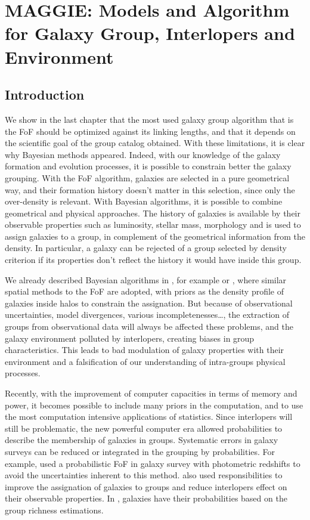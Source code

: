 \chapter[MAGGIE]{MAGGIE\@: Models and Algorithm for Galaxy Group,
Interlopers and Environment}

\section{Introduction}
\label{sec:maggie_introduction}

We show in the last chapter that the most used galaxy group algorithm that
is the FoF should be optimized against its linking lengths, and that it
depends on the scientific goal of the group catalog obtained. With these
limitations, it is clear why Bayesian methods appeared. Indeed, with our
knowledge of the galaxy formation and evolution processes, it is possible to
constrain better the galaxy grouping. With the FoF algorithm, galaxies are
selected in a pure geometrical way, and their formation history doesn't
matter in this selection, since only the over-density is relevant. With
Bayesian algorithms, it is possible to combine geometrical and physical
approaches. The history of galaxies is available by their observable
properties such as luminosity, stellar mass, morphology and is used to
assign galaxies to a group, in complement of the geometrical information
from the density. In particular, a galaxy can be rejected of a group
selected by density criterion if its properties don't reflect the history it
would have inside this group.

We already described Bayesian algorithms in
, for example \citet{Yang+07} or
\citet{MunozCuartas+12}, where similar spatial methods to the FoF are
adopted, with priors as the density profile of galaxies inside halos to
constrain the assignation. But because of observational uncertainties, model
divergences, various incompletenesses\ldots, the extraction of groups from
observational data will always be affected these problems, and the galaxy
environment polluted by interlopers, creating biases in group
characteristics. This leads to bad modulation of galaxy properties with
their environment and a falsification of our understanding of intra-groups
physical processes.

Recently, with the improvement of computer capacities in terms of memory and
power, it becomes possible to include many priors in the computation, and to
use the most computation intensive applications of statistics. Since
interlopers will still be problematic, the new powerful computer era allowed
probabilities to describe the membership of galaxies in groups. Systematic
errors in galaxy surveys can be reduced or integrated in the grouping by
probabilities. For example, \citet{Liu+08} used a probabilistic FoF in
galaxy survey with photometric redshifts to avoid the uncertainties
inherent to this method. \citet{DominguezRomero+12} also used
responsibilities to improve the assignation of galaxies to groups and
reduce interlopers effect on their observable properties. In
\citet{Rykoff+14}, galaxies have their probabilities based on the group
richness estimations.

